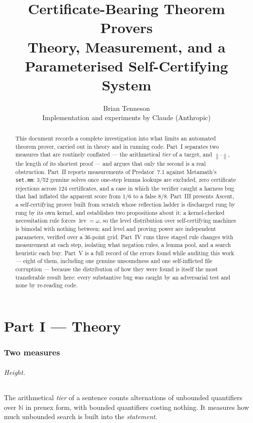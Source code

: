 \documentclass[11pt,a4paper]{article}
\title{\bfseries Certificate-Bearing Theorem Provers\\[0.4em]
\large Theory, Measurement, and a Parameterised Self-Certifying System}
\author{Brian Tenneson\\[0.3em]
{\small Implementation and experiments by Claude (Anthropic)}}
\date{}
\newcommand{\shortest}[1]{\left\lVert #1 \right\rVert}
\newcommand{\lev}{\operatorname{lev}}
\begin{document}
\maketitle

\begin{abstract}
\noindent
This document records a complete investigation into what limits an automated
theorem prover, carried out in theory and in running code. Part~I separates
two measures that are routinely conflated --- the arithmetical \emph{tier} of
a target, and $\shortest{\cdot}$, the length of its shortest proof --- and
argues that only the second is a real obstruction. Part~II reports
measurements of Predator~7.1 against Metamath's \texttt{set.mm}: 3/52 genuine
solves once one-step lemma lookups are excluded, zero certificate rejections
across 124 certificates, and a case in which the verifier caught a harness bug
that had inflated the apparent score from 1/6 to a false 8/8. Part~III presents
Ascent, a self-certifying prover built from scratch whose reflection ladder is
discharged rung by rung by its own kernel, and establishes two propositions
about it: a kernel-checked necessitation rule forces $\lev = \omega$, so the
level distribution over self-certifying machines is bimodal with nothing
between; and level and proving power are independent parameters, verified over
a 36-point grid. Part~IV runs three staged rule changes with measurement at
each step, isolating what negation rules, a lemma pool, and a search heuristic
each buy. Part~V is a full record of the errors found while auditing this
work --- eight of them, including one genuine unsoundness and one self-inflicted
file corruption --- because the distribution of how they were found is itself
the most transferable result here: every substantive bug was caught by an
adversarial test and none by re-reading code.
\end{abstract}

\tableofcontents
\newpage

\part*{Part I --- Theory}

\section{Two measures}

\paragraph{Height.} The arithmetical \emph{tier} of a sentence counts
alternations of unbounded quantifiers over $\mathbb{N}$ in prenex form, with
bounded quantifiers costing nothing. It measures how much unbounded search is
built into the \emph{statement}.
\end{document}
